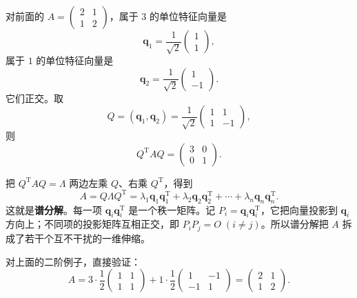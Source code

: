对前面的 \(A=\begin{pmatrix}2&1\\1&2\end{pmatrix}\)，属于 \(3\) 的单位特征向量是
\[
\mathbf{q}_1=\frac1{\sqrt2}\begin{pmatrix}1\\1\end{pmatrix},
\]
属于 \(1\) 的单位特征向量是
\[
\mathbf{q}_2=\frac1{\sqrt2}\begin{pmatrix}1\\-1\end{pmatrix}.
\]
它们正交。取
\[
Q=(\mathbf{q}_1,\mathbf{q}_2)=\frac1{\sqrt2}\begin{pmatrix}1&1\\1&-1\end{pmatrix},
\]
则
\[
Q^{\mathrm{T}}AQ=\begin{pmatrix}3&0\\0&1\end{pmatrix}.
\]

把 \(Q^{\mathrm{T}}AQ=\Lambda\) 两边左乘 \(Q\)、右乘 \(Q^{\mathrm{T}}\)，得到
\[
A=Q\Lambda Q^{\mathrm{T}}
=\lambda_1\mathbf{q}_1\mathbf{q}_1^{\mathrm{T}}
+\lambda_2\mathbf{q}_2\mathbf{q}_2^{\mathrm{T}}
+\cdots+
\lambda_n\mathbf{q}_n\mathbf{q}_n^{\mathrm{T}}.
\]
这就是\textbf{谱分解}。每一项 \(\mathbf{q}_i\mathbf{q}_i^{\mathrm{T}}\) 是一个秩一矩阵。记 \(P_i=\mathbf{q}_i\mathbf{q}_i^{\mathrm{T}}\)，它把向量投影到 \(\mathbf{q}_i\) 方向上；不同项的投影矩阵互相正交，即 \(P_iP_j=O\;(i\neq j)\)。所以谱分解把 \(A\) 拆成了若干个互不干扰的一维伸缩。

对上面的二阶例子，直接验证：
\[
A=3\cdot\frac12\begin{pmatrix}1&1\\1&1\end{pmatrix}
+1\cdot\frac12\begin{pmatrix}1&-1\\-1&1\end{pmatrix}
=\begin{pmatrix}2&1\\1&2\end{pmatrix}.
\]

